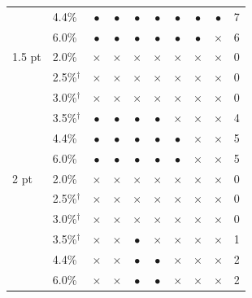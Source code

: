 \begin{tabular}{llcccccccr}
 & 4.4\% & $\bullet$ & $\bullet$ & $\bullet$ & $\bullet$ & $\bullet$ & $\bullet$ & $\bullet$ & 7 \\
 & 6.0\% & $\bullet$ & $\bullet$ & $\bullet$ & $\bullet$ & $\bullet$ & $\bullet$ & $\times$ & 6 \\
\midrule
1.5 pt & 2.0\% & $\times$ & $\times$ & $\times$ & $\times$ & $\times$ & $\times$ & $\times$ & 0 \\
 & 2.5\%$^{\dagger}$ & $\times$ & $\times$ & $\times$ & $\times$ & $\times$ & $\times$ & $\times$ & 0 \\
 & 3.0\%$^{\dagger}$ & $\times$ & $\times$ & $\times$ & $\times$ & $\times$ & $\times$ & $\times$ & 0 \\
 & 3.5\%$^{\dagger}$ & $\bullet$ & $\bullet$ & $\bullet$ & $\bullet$ & $\times$ & $\times$ & $\times$ & 4 \\
 & 4.4\% & $\bullet$ & $\bullet$ & $\bullet$ & $\bullet$ & $\bullet$ & $\times$ & $\times$ & 5 \\
 & 6.0\% & $\bullet$ & $\bullet$ & $\bullet$ & $\bullet$ & $\bullet$ & $\times$ & $\times$ & 5 \\
\midrule
2 pt & 2.0\% & $\times$ & $\times$ & $\times$ & $\times$ & $\times$ & $\times$ & $\times$ & 0 \\
 & 2.5\%$^{\dagger}$ & $\times$ & $\times$ & $\times$ & $\times$ & $\times$ & $\times$ & $\times$ & 0 \\
 & 3.0\%$^{\dagger}$ & $\times$ & $\times$ & $\times$ & $\times$ & $\times$ & $\times$ & $\times$ & 0 \\
 & 3.5\%$^{\dagger}$ & $\times$ & $\times$ & $\bullet$ & $\times$ & $\times$ & $\times$ & $\times$ & 1 \\
 & 4.4\% & $\times$ & $\times$ & $\bullet$ & $\bullet$ & $\times$ & $\times$ & $\times$ & 2 \\
 & 6.0\% & $\times$ & $\times$ & $\bullet$ & $\bullet$ & $\times$ & $\times$ & $\times$ & 2 \\
\bottomrule
\end{tabular}
